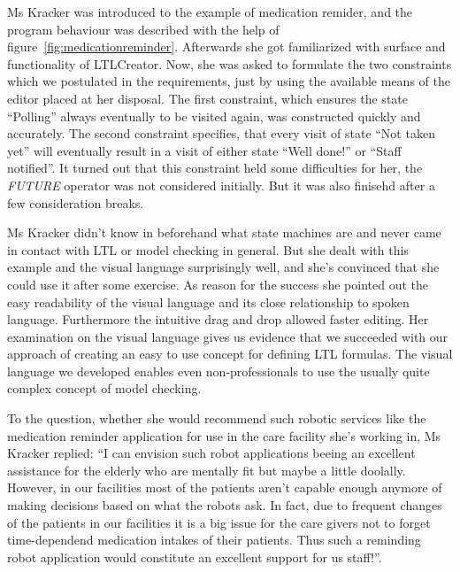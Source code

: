 Ms Kracker was introduced to the example of medication remider, and the program behaviour was described with the help of figure~\ref{fig:medicationreminder}. Afterwards she got familiarized with surface and functionality of LTLCreator. Now, she was asked to formulate the two constraints which we postulated in the requirements, just by using the available means of the editor placed at her disposal.
The first constraint, which ensures the state ``Polling'' always eventually to be visited again, was constructed quickly and accurately.
The second constraint specifies, that every visit of state ``Not taken yet'' will eventually result in a visit of either state ``Well done!'' or ``Staff notified''. It turned out that this constraint held some difficulties for her, the \emph{FUTURE} operator was not considered initially. But it was also finisehd after a few consideration breaks.

Ms Kracker didn't know in beforehand what state machines are and never came in contact with LTL or model checking in general. But she dealt with this example and the visual language surprisingly well, and she's convinced that she could use it after some exercise. As reason for the success she pointed out the easy readability of the visual language and its close relationship to spoken language. Furthermore the intuitive drag and drop allowed faster editing.
Her examination on the visual language gives us evidence that we succeeded with our approach of creating an easy to use concept for defining LTL formulas. The visual language we developed enables even non-professionals to use the usually quite complex concept of model checking.

To the question, whether she would recommend such robotic services like the medication reminder application for use in the care facility she's working in, Ms Kracker replied: ``I can envision such robot applications beeing an excellent assistance for the elderly who are mentally fit but maybe a little doolally. However, in our facilities most of the patients aren't capable enough anymore of making decisions based on what the robots ask. In fact, due to frequent changes of the patients in our facilities it is a big issue for the care givers not to forget time-dependend medication intakes of their patients. Thus such a reminding robot application would constitute an excellent support for us staff!''.